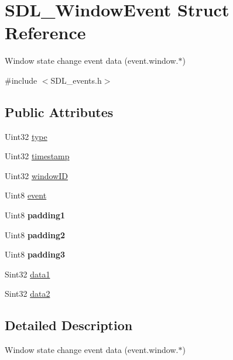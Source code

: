 \hypertarget{struct_s_d_l___window_event}{}\section{S\+D\+L\+\_\+\+Window\+Event Struct Reference}
\label{struct_s_d_l___window_event}


Window state change event data (event.\+window.$\ast$)  




{\ttfamily \#include $<$S\+D\+L\+\_\+events.\+h$>$}

\subsection*{Public Attributes}
\begin{DoxyCompactItemize}
\item 
Uint32 \mbox{\hyperlink{struct_s_d_l___window_event_a01c8c8fbe8564e690f958d2db560f657}{type}}
\item 
Uint32 \mbox{\hyperlink{struct_s_d_l___window_event_a7b0bf569b20cfa4e3fb76e3301d616f9}{timestamp}}
\item 
Uint32 \mbox{\hyperlink{struct_s_d_l___window_event_a4b31796ffc84fbb7f6e9ba33e127619a}{window\+ID}}
\item 
Uint8 \mbox{\hyperlink{struct_s_d_l___window_event_a485cd1f07f0f22fdb9f4c4bf214011dc}{event}}
\item 
\mbox{\label{struct_s_d_l___window_event_a09ee59114246eceed4a281033ec6609b}} 
Uint8 {\bfseries padding1}
\item 
\mbox{\label{struct_s_d_l___window_event_a6bcf773b690b894e8c04c591826d0c8a}} 
Uint8 {\bfseries padding2}
\item 
\mbox{\label{struct_s_d_l___window_event_ac352263b5fa4ba6dbd64a48062d5e29f}} 
Uint8 {\bfseries padding3}
\item 
Sint32 \mbox{\hyperlink{struct_s_d_l___window_event_a01da0025428d3434c80021f3e4089fec}{data1}}
\item 
Sint32 \mbox{\hyperlink{struct_s_d_l___window_event_af6cd0a21bc9ecadfee42f6a0147d7171}{data2}}
\end{DoxyCompactItemize}


\subsection{Detailed Description}
Window state change event data (event.\+window.$\ast$) 

